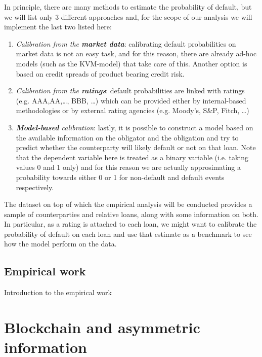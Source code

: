 \documentclass[a4paper,12pt]{article}
\begin{document}
    In principle, there are many methods to estimate the probability of default,
    but we will list only 3 different approaches and, for the scope of our analysis
    we will implement the last two listed here:

        \begin{enumerate}
            \item \textit{Calibration from the \textbf{market data}}: calibrating default probabilities on market data is not an easy task, and for this reason, there are already ad-hoc models (such as the KVM-model) that take care of this. Another option is based on credit spreads of product bearing credit risk.
            \item \textit{Calibration from the \textbf{ratings}}: default probabilities are linked with ratings (e.g. AAA,AA,\dots, BBB, \dots) which can be provided either by internal-based methodologies or by external rating agencies (e.g. Moody's, S\&P, Fitch, \dots)
            \item \textit{\textbf{Model-based} calibration}: lastly, it is possible to construct a model based on the available information on the obligator and the obligation and try to predict whether the counterparty will likely default or not on that loan. Note that the dependent variable here is treated as a binary variable (i.e. taking values 0 and 1 only) and for this reason we are actually approsimating a probability towards either 0 or 1 for non-default and default events respectively. 
        \end{enumerate}
        The dataset on top of which the empirical analysis will be conducted provides a sample of counterparties and relative loans, along with some information on both. In particular,
        as a rating is attached to each loan, we might want to calibrate the probability of default on each loan and use that estimate as a benchmark to see how the model perform on the data.
    
    \pagebreak
    \subsection[]{Empirical work}
    
    Introduction to the empirical work

    \pagebreak
    \section{Blockchain and asymmetric information}
\end{document}
